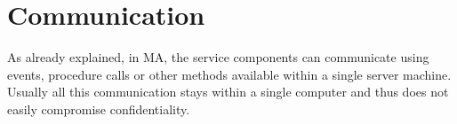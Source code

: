


\section{Communication}
\begin{sloppypar}
    As already explained, in MA, the service components can communicate using 
    events, procedure calls or other methods available within a single server 
    machine. Usually all this communication stays within a single computer and 
    thus does not easily compromise confidentiality.
\end{sloppypar}
\begin{sloppypar}
    
\end{sloppypar}






